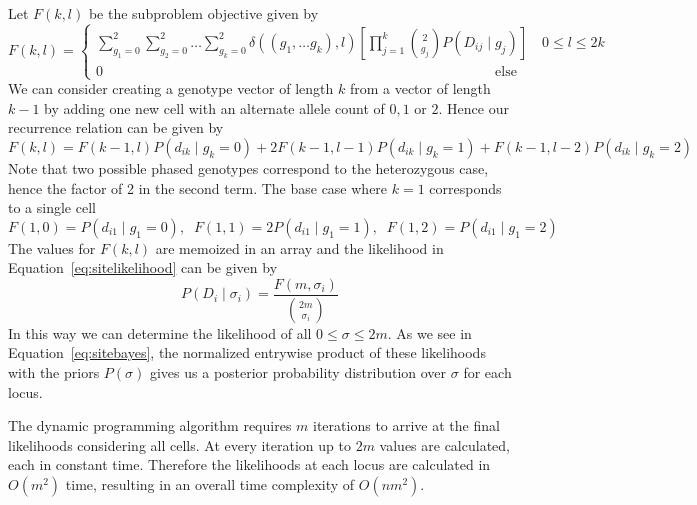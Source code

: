 \documentclass[../../main.tex]{subfiles}
\begin{document}
Let $F(k,l)$ be the subproblem objective given by
\begin{equation}
F(k,l) = \begin{cases} \sum_{g_1=0}^2\sum_{g_2=0}^2\dots\sum_{g_k=0}^2 \delta((g_1,\dots g_k),l)\left[\prod_{j=1}^{k}\binom{2}{g_j}P(D_{ij}\mid g_{j})\right] \quad 0\leq l \leq 2k \\
0 \qquad\qquad\qquad\qquad\qquad\qquad\qquad\qquad\qquad\qquad\qquad\qquad\qquad\qquad \text{else} \end{cases}
\end{equation}
We can consider creating a genotype vector of length $k$ from a vector of length $k-1$ by adding one new cell with an alternate allele count of $0,1$ or $2$.
Hence our recurrence relation can be given by
\begin{equation}
F(k,l) = F(k-1,l)P(d_{ik}\mid g_k = 0) + 2F(k-1,l-1)P(d_{ik}\mid g_k = 1) + F(k-1,l-2)P(d_{ik}\mid g_k = 2)
\end{equation}
Note that two possible phased genotypes correspond to the heterozygous case, hence the factor of 2 in the second term.
The base case where $k=1$ corresponds to a single cell
\begin{equation*}
F(1,0) = P(d_{i1}\mid g_1 = 0),\;\; F(1,1) = 2P(d_{i1}\mid g_1=1),\;\; F(1,2) = P(d_{i1}\mid g_1 = 2)
\end{equation*}
The values for $F(k,l)$ are memoized in an array and the likelihood in Equation~\ref{eq:sitelikelihood} can be given by
\begin{equation}
P(D_i\mid \sigma_i)=\frac{F(m,\sigma_i)}{\binom{2m}{\sigma_i}}
\end{equation}
In this way we can determine the likelihood of all $0\leq \sigma\leq 2m$.
As we see in Equation~\eqref{eq:sitebayes}, the normalized entrywise product of these likelihoods with the priors $P(\sigma)$ gives us a posterior probability distribution over $\sigma$ for each locus.

The dynamic programming algorithm requires $m$ iterations to arrive at the final likelihoods considering all cells.
At every iteration up to $2m$ values are calculated, each in constant time.
Therefore the likelihoods at each locus are calculated in $O(m^2)$ time, resulting in an overall time complexity of $O(nm^2)$.
\end{document}
